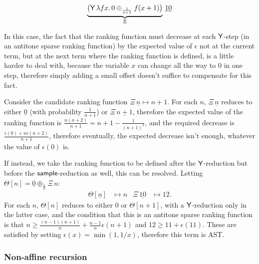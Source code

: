 \begin{example}
\label{ex:escaping spline}\cite[\S 5.4]{DBLP:journals/pacmpl/McIverMKK18}
\[
\underbrace{\big
(\mathsf{Y} \, \lambda f x . \,
0 \oplus_{\frac{1}{x+1}} f(x + 1) \big)}_{\Xi} 
\, \underline{10}
\]

In this case, the fact that the ranking function must decrease at each $\mathsf{Y}$-step (in an antitone sparse ranking function) by the expected value of $\epsilon$ not at the current term, but at the next term where the ranking function is defined, is a little harder to deal with, because the variable $x$ can change all the way to $0$ in one step, therefore simply adding a small offset doesn't suffice to compensate for this fact.

Consider the candidate ranking function $\Xi \, \underline n \mapsto n + 1$. For each $n$, $\Xi \, \underline n$ reduces to either $\underline 0$ (with probability $\frac 1 {n + 1}$) or $\Xi \, \underline{n + 1}$, therefore the expected value of the ranking function is $\frac{n(n+2)}{n+1} = n + 1 - \frac 1 {(n+1)^2}$, and the required decrease is $\frac{\epsilon(0) + n \epsilon(n + 2)}{n + 1}$, therefore eventually, the expected decrease isn't enough, whatever the value of $\epsilon(0)$ is.

If instead, we take the ranking function to be defined after the $\mathsf{Y}$-reduction but before the $\mathsf{sample}$-reduction as well, this can be resolved. Letting $\Theta[n] = \underline 0 \oplus_{\frac 1 n} \Xi \, n$:
\begin{align*}
\Theta[\underline n] &\mapsto n &
\Xi \, \underline{10} & \mapsto 12.
\end{align*}
For each $n$, $\Theta[n]$ reduces to either $0$ or $\Theta[n+1]$, with a $\mathsf{Y}$-reduction only in the latter case, and the condition that this is an antitone sparse ranking function is that $n \geq \frac{(n-1)(n+1)}{n} + \frac{n-1}{n} \epsilon(n+1)$ and $12 \geq 11 + \epsilon(11)$. These are satisfied by setting $\epsilon(x) = \min(1, 1/x)$, therefore this term is AST.
\end{example}


\subsubsection*{Non-affine recursion}

